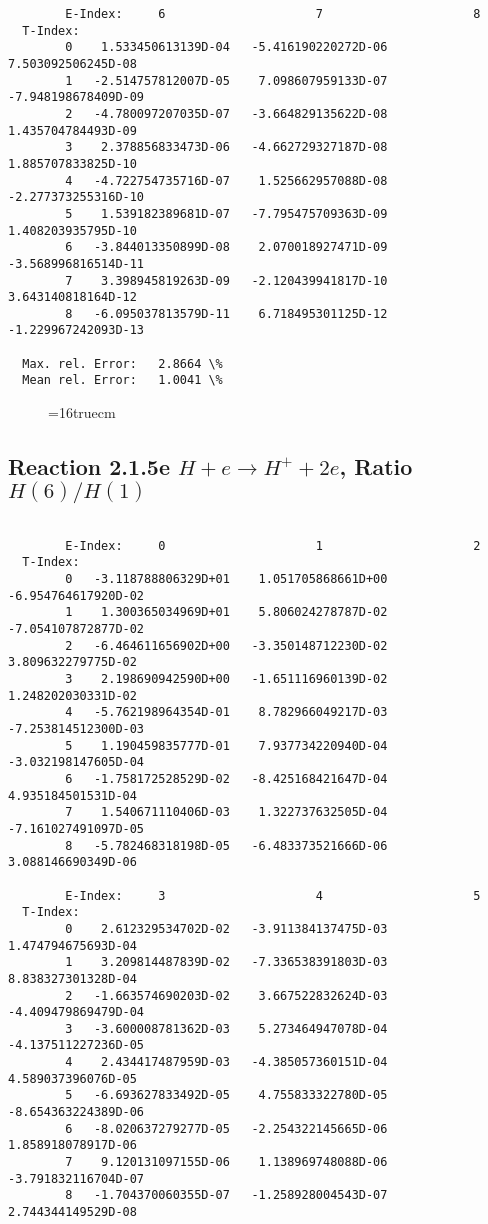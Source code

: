 \documentclass[12pt,dvipdfmx]{article}
\begin{document}
{\begin{small}
\begin{verbatim}
        E-Index:     6                     7                     8
  T-Index:
        0    1.533450613139D-04   -5.416190220272D-06    7.503092506245D-08
        1   -2.514757812007D-05    7.098607959133D-07   -7.948198678409D-09
        2   -4.780097207035D-07   -3.664829135622D-08    1.435704784493D-09
        3    2.378856833473D-06   -4.662729327187D-08    1.885707833825D-10
        4   -4.722754735716D-07    1.525662957088D-08   -2.277373255316D-10
        5    1.539182389681D-07   -7.795475709363D-09    1.408203935795D-10
        6   -3.844013350899D-08    2.070018927471D-09   -3.568996816514D-11
        7    3.398945819263D-09   -2.120439941817D-10    3.643140818164D-12
        8   -6.095037813579D-11    6.718495301125D-12   -1.229967242093D-13

  Max. rel. Error:   2.8664 \%
  Mean rel. Error:   1.0041 \%

\end{verbatim}\end{small}
\begin{figure} \label{2.1.5d}
\epsfxsize=16truecm
\end{figure}

\newpage
\subsection{
Reaction 2.1.5e  $H + e \rightarrow H^+ + 2e$, Ratio $H(6)/H(1)$
}


\begin{small}\begin{verbatim}

        E-Index:     0                     1                     2
  T-Index:
        0   -3.118788806329D+01    1.051705868661D+00   -6.954764617920D-02
        1    1.300365034969D+01    5.806024278787D-02   -7.054107872877D-02
        2   -6.464611656902D+00   -3.350148712230D-02    3.809632279775D-02
        3    2.198690942590D+00   -1.651116960139D-02    1.248202030331D-02
        4   -5.762198964354D-01    8.782966049217D-03   -7.253814512300D-03
        5    1.190459835777D-01    7.937734220940D-04   -3.032198147605D-04
        6   -1.758172528529D-02   -8.425168421647D-04    4.935184501531D-04
        7    1.540671110406D-03    1.322737632505D-04   -7.161027491097D-05
        8   -5.782468318198D-05   -6.483373521666D-06    3.088146690349D-06

        E-Index:     3                     4                     5
  T-Index:
        0    2.612329534702D-02   -3.911384137475D-03    1.474794675693D-04
        1    3.209814487839D-02   -7.336538391803D-03    8.838327301328D-04
        2   -1.663574690203D-02    3.667522832624D-03   -4.409479869479D-04
        3   -3.600008781362D-03    5.273464947078D-04   -4.137511227236D-05
        4    2.434417487959D-03   -4.385057360151D-04    4.589037396076D-05
        5   -6.693627833492D-05    4.755833322780D-05   -8.654363224389D-06
        6   -8.020637279277D-05   -2.254322145665D-06    1.858918078917D-06
        7    9.120131097155D-06    1.138969748088D-06   -3.791832116704D-07
        8   -1.704370060355D-07   -1.258928004543D-07    2.744344149529D-08


\end{verbatim}
\end{small}}
\end{document}
